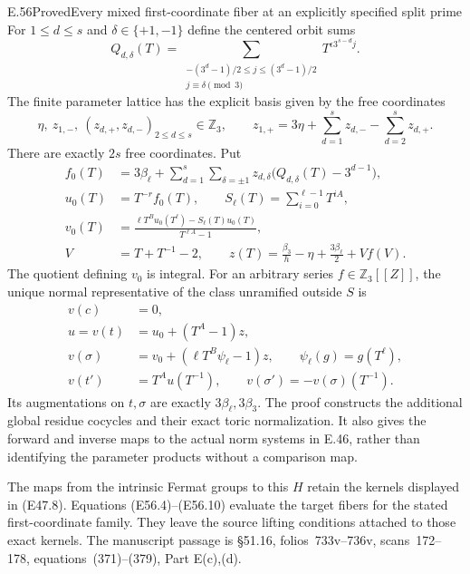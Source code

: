 \begin{statement}{E.56}{Proved}{Every mixed first-coordinate fiber at an explicitly specified split prime}
For $1\le d\le s$ and $\delta\in\{+1,-1\}$ define
the centered orbit sums
\[
 Q_{d,\delta}(T)=
   \sum_{\substack{-(3^d-1)/2\le j\le(3^d-1)/2\\
                                  j\equiv\delta\pmod3}}
                      T^{\epsilon3^{s-d}j}.
 \tag{E56.7}
\]
The finite parameter lattice has the explicit basis
given by the free coordinates
\[
  \eta,\ z_{1,-},\
                  (z_{d,+},z_{d,-})_{2\le d\le s}\in\mathbb Z_3,
 \qquad
 z_{1,+}=3\eta+\sum_{d=1}^s z_{d,-}
                           -\sum_{d=2}^s z_{d,+}.
 \tag{E56.8}
\]
There are exactly $2s$ free coordinates.
Put
\[
 \begin{split}
 f_0(T)&=3\beta_\ell+
       \sum_{d=1}^s\sum_{\delta=\pm1}
          z_{d,\delta}\bigl(Q_{d,\delta}(T)-3^{d-1}\bigr),\\
 u_0(T)&=T^{-r}f_0(T),\qquad
 S_\ell(T)=\sum_{i=0}^{\ell-1}T^{iA},\\
 v_0(T)&=
       \frac{\ell T^B u_0(T^\ell)-S_\ell(T)u_0(T)}
                                                {T^{\ell A}-1},\\
 V&=T+T^{-1}-2,\qquad
 z(T)=\frac{\beta_3}{h}-\eta+\frac{3\beta_\ell}{2}
                                                   +Vf(V).
 \end{split}
 \tag{E56.9}
\]
The quotient defining $v_0$ is integral. For an arbitrary
series $f\in\mathbb Z_3[[Z]]$, the unique normal representative
of the class unramified outside $S$ is
\[
 \begin{split}
 v(c)&=0,\\
 u=v(t)&=u_0+(T^A-1)z,\\
 v(\sigma)&=v_0+(\ell T^B\psi_\ell-1)z,
                       \qquad\psi_\ell(g)=g(T^\ell),\\
 v(t')&=T^A u(T^{-1}),\qquad
 v(\sigma')=-v(\sigma)(T^{-1}).
 \end{split}
 \tag{E56.10}
\]
Its augmentations on $t,\sigma$ are exactly
$3\beta_\ell,3\beta_3$.
The proof constructs the additional global residue
cocycles and their exact toric normalization.
It also gives the forward and inverse maps to the
actual norm systems in E.46, rather than identifying
the parameter products without a comparison map.

The maps from the intrinsic Fermat groups to this
$H$ retain the kernels displayed in (E47.8).
Equations (E56.4)--(E56.10) evaluate the target
fibers for the stated first-coordinate family.
They leave the source lifting conditions attached
to those exact kernels. The manuscript passage is
\S51.16, folios~733v--736v, scans~172--178,
equations~(371)--(379), Part E(c),(d).
\end{statement}

